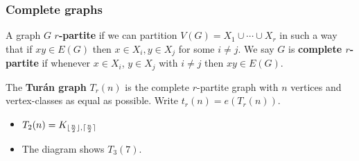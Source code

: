 \documentclass{article}
\DeclarePairedDelimiter\ceil{\lceil}{\rceil}
\DeclarePairedDelimiter\floor{\lfloor}{\rfloor}
\begin{document}
\subsubsection{Complete graphs}

\begin{defi}
    A graph $G$ \textbf{$r$-partite}  if we can partition $V(G) = X_1 \cup \dotsb \cup X_r$ in such a way that if $xy \in E(G)$ then $x \in X_i, y \in X_j$ for some $i \neq j$.
    We say $G$ is \textbf{complete $r$-partite} if whenever $x \in X_i$, $y \in X_j$ with $i \neq j$ then $x y \in E(G)$.
\end{defi}

\begin{defi}
    The \textbf{Tur\'{a}n graph} $T_r(n)$ is the complete $r$-partite graph with $n$ vertices and vertex-classes as equal as possible. Write $t_r(n) = e(T_r(n))$.
\end{defi}

\begin{eg}
    \leavevmode
    \begin{itemize}
        \item $T_2(n) = K_{\floor{\frac{n}{2}}, \ceil{\frac{n}{2}}}$
        \item The diagram shows $T_3(7)$.
    \end{itemize}
\end{eg}
\end{document}
